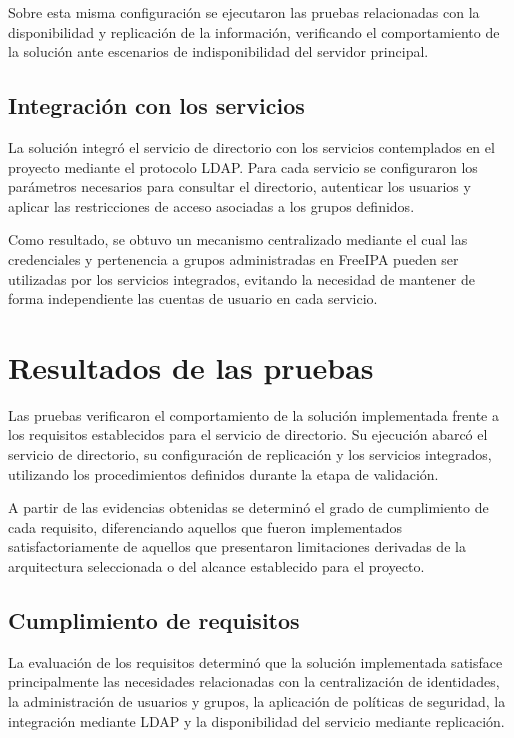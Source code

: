 Sobre esta misma configuración se ejecutaron las pruebas relacionadas con la disponibilidad y replicación de la información, verificando el comportamiento de la solución ante escenarios de indisponibilidad del servidor principal.

\subsection{Integración con los servicios}
\label{subsec:resultado-integracion}

La solución integró el servicio de directorio con los servicios contemplados en el proyecto mediante el protocolo LDAP. Para cada servicio se configuraron los parámetros necesarios para consultar el directorio, autenticar los usuarios y aplicar las restricciones de acceso asociadas a los grupos definidos.

Como resultado, se obtuvo un mecanismo centralizado mediante el cual las credenciales y pertenencia a grupos administradas en FreeIPA pueden ser utilizadas por los servicios integrados, evitando la necesidad de mantener de forma independiente las cuentas de usuario en cada servicio.

\section{Resultados de las pruebas}
\label{sec:resultados-pruebas}

Las pruebas verificaron el comportamiento de la solución implementada frente a los requisitos establecidos para el servicio de directorio. Su ejecución abarcó el servicio de directorio, su configuración de replicación y los servicios integrados, utilizando los procedimientos definidos durante la etapa de validación.

A partir de las evidencias obtenidas se determinó el grado de cumplimiento de cada requisito, diferenciando aquellos que fueron implementados satisfactoriamente de aquellos que presentaron limitaciones derivadas de la arquitectura seleccionada o del alcance establecido para el proyecto.

\subsection{Cumplimiento de requisitos}
\label{subsec:resultado-requisitos}

La evaluación de los requisitos determinó que la solución implementada satisface principalmente las necesidades relacionadas con la centralización de identidades, la administración de usuarios y grupos, la aplicación de políticas de seguridad, la integración mediante LDAP y la disponibilidad del servicio mediante replicación.


